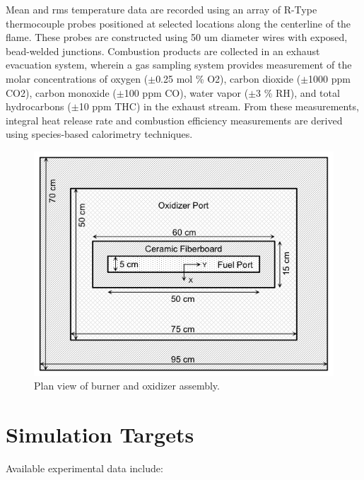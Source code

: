 \documentclass{article}
\begin{document}
Mean and rms temperature data are recorded using an array of R-Type thermocouple probes positioned at selected locations along the centerline of the flame. These probes are constructed using 50 um diameter wires with exposed, bead-welded junctions. Combustion products are collected in an exhaust evacuation system, wherein a gas sampling system provides measurement of the molar concentrations of oxygen ($\pm$0.25 mol \% O2), carbon dioxide ($\pm$1000 ppm CO2), carbon monoxide ($\pm$100 ppm CO), water vapor ($\pm$3 \% RH), and total hydrocarbons ($\pm$10 ppm THC) in the exhaust stream. From these measurements, integral heat release rate and combustion efficiency measurements are derived using species-based calorimetry techniques.

\begin{figure}
\centering
\includegraphics[width=.8\textwidth]{umd_line_burner_plan_view}
\caption{Plan view of burner and oxidizer assembly.}
\label{fig:umd_line_burner_plan_view}
\end{figure}

\section{Simulation Targets}

Available experimental data include:
\end{document}
